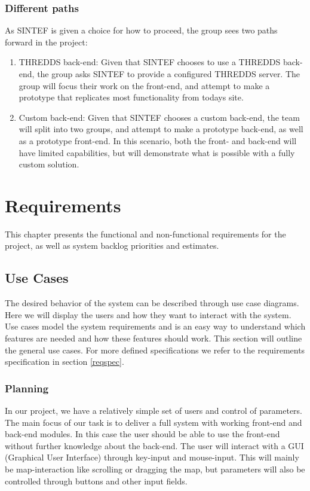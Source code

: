 \documentclass[11pt,a4paper,titlepage,oneside]{report}
\begin{document}
\subsection{Different paths}
As SINTEF is given a choice for how to proceed, the group sees two paths forward in the project:
\begin{enumerate}
\item \gls{THREDDS} back-end: Given that SINTEF chooses to use a \gls{THREDDS} back-end, the group asks SINTEF to provide a configured \gls{THREDDS} server. The group will focus their work on the front-end, and attempt to make a prototype that replicates most functionality from todays site.
\item Custom back-end: Given that SINTEF chooses a custom back-end, the team will split into two groups, and attempt to make a prototype back-end, as well as a prototype front-end. In this scenario, both the front- and back-end will have limited capabilities, but will demonstrate what is possible with a fully custom solution.
\end{enumerate}


\chapter{Requirements}
\label{chap:Requirements}
This chapter presents the functional and non-functional requirements for the project, as well as system backlog priorities and estimates.

\section{Use Cases}
The desired behavior of the system can be described through use case diagrams. Here we will display the users and how they want to interact with the system. Use cases model the system requirements and is an easy way to understand which features are needed and how these features should work. This section will outline the general use cases. For more defined specifications we refer to the requirements specification in section \ref{reqspec}.

  \subsection{Planning}
  In our project, we have a relatively simple set of users and control of parameters. The main focus of our task is to deliver a full system with working front-end and back-end modules. In this case the user should be able to use the front-end without further knowledge about the back-end. The user will interact with a GUI (Graphical User Interface) through key-input and mouse-input. This will mainly be map-interaction like scrolling or dragging the map, but parameters will also be controlled through buttons and other input fields.
\end{document}
